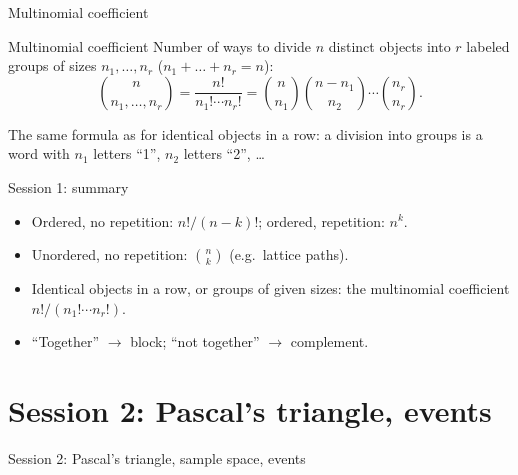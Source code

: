 \documentclass[aspectratio=169,11pt,usepdftitle=false]{beamer}
\begin{document}
\begin{frame}{Multinomial coefficient}
	\begin{block}{Multinomial coefficient}
		Number of ways to divide $n$ distinct objects into $r$ labeled groups of
		sizes $n_1,\dots,n_r$ ($n_1+\dots+n_r=n$):
		\[ \binom{n}{n_1,\dots,n_r} = \frac{n!}{n_1!\cdots n_r!}
			= \binom{n}{n_1}\binom{n-n_1}{n_2}\cdots\binom{n_r}{n_r}. \]
	\end{block}
	The same formula as for identical objects in a row: a division into groups
	is a word with $n_1$ letters ``1'', $n_2$ letters ``2'', \dots
\end{frame}


\begin{frame}{Session 1: summary}
	\small
	\begin{itemize}
		\item Ordered, no repetition: $n!/(n-k)!$; ordered, repetition: $n^k$.
		\item Unordered, no repetition: $\binom nk$ (e.g.\ lattice paths).
		\item Identical objects in a row, or groups of given sizes: the
		      multinomial coefficient $n!/(n_1!\cdots n_r!)$.
		\item ``Together'' $\to$ block; ``not together'' $\to$ complement.
	\end{itemize}
\end{frame}

\section{Session 2: Pascal's triangle, events}

\begin{frame}
	\centering\Large\color{navy}Session 2:
	Pascal's triangle, sample space, events
\end{frame}
\end{document}
